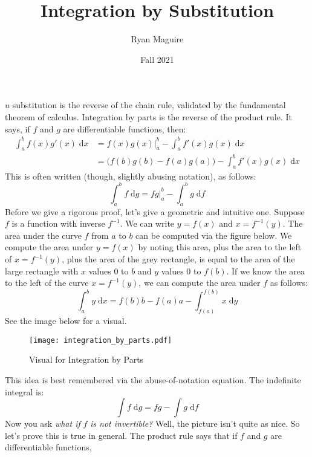 \documentclass{article}
\title{Integration by Substitution}
\author{Ryan Maguire}
\date{Fall 2021}
\begin{document}
    \maketitle
    $u$ substitution is the reverse of the chain rule, validated by the
    fundamental theorem of calculus. Integration by parts is the reverse of the
    product rule. It says, if $f$ and $g$ are differentiable functions, then:
    \begin{align}
        \int_{a}^{b}f(x)g'(x)\;\textrm{d}x
            &=f(x)g(x)\big|_{a}^{b}-\int_{a}^{b}f'(x)g(x)\;\textrm{d}x\\
            &=\Big(f(b)g(b)-f(a)g(a)\Big)-\int_{a}^{b}f'(x)g(x)\;\textrm{d}x
    \end{align}
    This is often written (though, slightly abusing notation), as follows:
    \begin{equation}
        \int_{a}^{b}f\;\textrm{d}g=fg\big|_{a}^{b}-\int_{a}^{b}g\;\textrm{d}f
    \end{equation}
    Before we give a rigorous proof, let's give a geometric and intuitive one.
    Suppose $f$ is a function with inverse $f^{-1}$. We can write
    $y=f(x)$ and $x=f^{-1}(y)$. The area under the curve $f$ from $a$ to $b$
    can be computed via the figure below. We compute the area under $y=f(x)$
    by noting this area, plus the area to the left of $x=f^{-1}(y)$, plus the
    area of the grey rectangle, is equal to the area of the large rectangle
    with $x$ values 0 to $b$ and $y$ values 0 to $f(b)$. If we know the area to
    the left of the curve $x=f^{-1}(y)$, we can compute the area under $f$ as
    follows:
    \begin{equation}
        \int_{a}^{b}y\;\textrm{d}x
            =f(b)b-f(a)a-\int_{f(a)}^{f(b)}x\;\textrm{d}y
    \end{equation}
    See the image below for a visual.
    \begin{figure}
        \centering
        \texttt{[image: integration\_by\_parts.pdf]}
        \caption{Visual for Integration by Parts}
    \end{figure}
    This idea is best remembered via the abuse-of-notation equation. The
    indefinite integral is:
    \begin{equation}
        \int{f}\;\textrm{d}g=fg-\int{g}\;\textrm{d}f
    \end{equation}
    Now you ask \textit{what if} $f$ \textit{is not invertible?} Well, the
    picture isn't quite as nice. So let's prove this is true in general.
    The product rule says that if $f$ and $g$ are differentiable functions,
\end{document}
